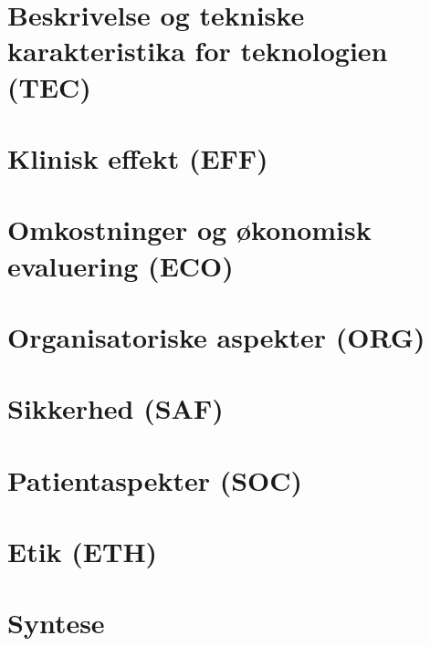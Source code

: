 \chapter{Beskrivelse og tekniske karakteristika for teknologien (TEC)}\vspace{-.75cm} \label{TEC_chap}


\chapter{Klinisk effekt (EFF)}\vspace{-.75cm} \label{EFF_chap}


\chapter{Omkostninger og økonomisk evaluering (ECO)}\vspace{-.75cm} \label{ECO_chap}


\chapter{Organisatoriske aspekter (ORG)}\vspace{-.75cm} \label{ORG_chap}


\chapter{Sikkerhed (SAF)}\vspace{-.75cm} \label{SAF_chap}


\chapter{Patientaspekter (SOC)}\vspace{-.75cm} \label{SOC_chap}


\chapter{Etik (ETH)}\vspace{-.75cm} \label{ETH_chap}




\chapter{Syntese}\vspace{-.75cm}\label{syntese_chap}



\cleardoublepage

\begingroup
\label{litteraturliste}
\raggedright


\endgroup

\begin{appendices}
	
	
\end{appendices}


